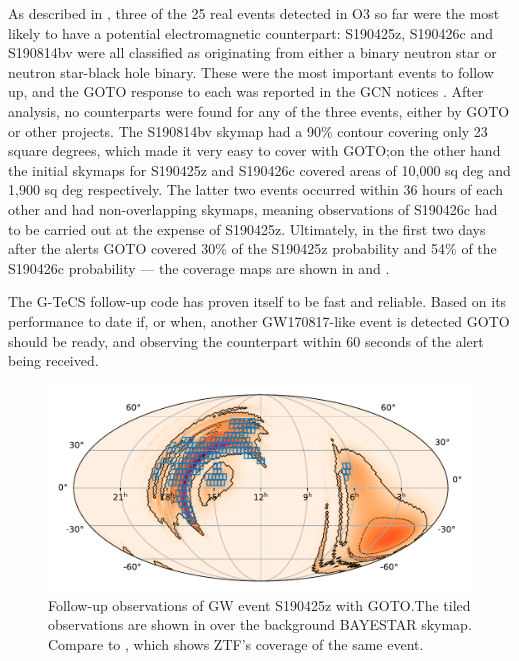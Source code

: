 \begin{colsection}
\begin{colsection}
As described in , three of the 25 real events detected in O3 so far were the most likely to have a potential electromagnetic counterpart: S190425z, S190426c and S190814bv were all classified as originating from either a binary neutron star or neutron star-black hole binary. These were the most important events to follow up, and the GOTO response to each was reported in the GCN notices \citet{GW190425_GOTO, GW190426_GOTO, GW190814_GOTO}. After analysis, no counterparts were found for any of the three events, either by GOTO or other projects. The S190814bv skymap had a 90\% contour covering only 23 square degrees, which made it very easy to cover with GOTO;\@ on the other hand the initial skymaps for S190425z and S190426c covered areas of 10,000 sq deg and 1,900 sq deg respectively. The latter two events occurred within 36 hours of each other and had non-overlapping skymaps, meaning observations of S190426c had to be carried out at the expense of S190425z. Ultimately, in the first two days after the alerts GOTO covered 30\% of the S190425z probability \citep{GW190425_GOTO} and 54\% of the S190426c probability \citep{GW190426_GOTO} --- the coverage maps are shown in  and .

The G-TeCS follow-up code has proven itself to be fast and reliable. Based on its performance to date if, or when, another GW170817-like event is detected GOTO should be ready, and observing the counterpart within 60 seconds of the alert being received.

\begin{figure}[p]
    \begin{center}
        \includegraphics[width=0.9\linewidth]{images/190425_goto.pdf}
    \end{center}
    \caption[Follow-up observations of S190425z with GOTO]{
        Follow-up observations of GW event S190425z with GOTO.\@ The tiled observations are shown in  over the background BAYESTAR skymap. Compare to , which shows ZTF's coverage of the same event.
        }\label{fig:190425_goto}
\end{figure}


\end{colsection}
\end{colsection}
